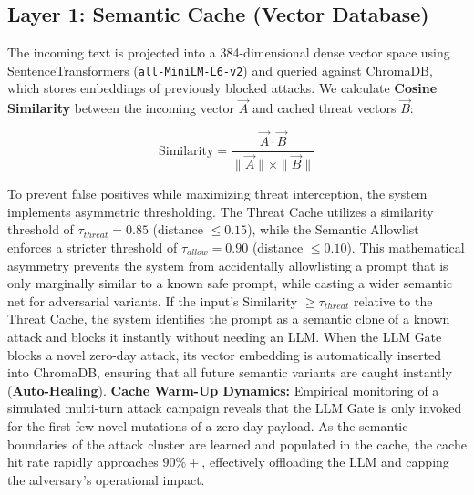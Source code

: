 \documentclass[conference]{IEEEtran}
\begin{document}
\subsection{Layer 1: Semantic Cache (Vector Database)}
The incoming text is projected into a 384-dimensional dense vector space using SentenceTransformers (\texttt{all-MiniLM-L6-v2}) and queried against ChromaDB, which stores embeddings of previously blocked attacks. We calculate \textbf{Cosine Similarity} between the incoming vector $\vec{A}$ and cached threat vectors $\vec{B}$:

\begin{equation}
\text{Similarity} = \frac{\vec{A} \cdot \vec{B}}{\|\vec{A}\| \times \|\vec{B}\|}
\end{equation}

To prevent false positives while maximizing threat interception, the system implements asymmetric thresholding. The Threat Cache utilizes a similarity threshold of $\tau_{threat} = 0.85$ (distance $\leq 0.15$), while the Semantic Allowlist enforces a stricter threshold of $\tau_{allow} = 0.90$ (distance $\leq 0.10$). This mathematical asymmetry prevents the system from accidentally allowlisting a prompt that is only marginally similar to a known safe prompt, while casting a wider semantic net for adversarial variants. If the input's Similarity $\geq \tau_{threat}$ relative to the Threat Cache, the system identifies the prompt as a semantic clone of a known attack and blocks it instantly without needing an LLM. When the LLM Gate blocks a novel zero-day attack, its vector embedding is automatically inserted into ChromaDB, ensuring that all future semantic variants are caught instantly (\textbf{Auto-Healing}). \textbf{Cache Warm-Up Dynamics:} Empirical monitoring of a simulated multi-turn attack campaign reveals that the LLM Gate is only invoked for the first few novel mutations of a zero-day payload. As the semantic boundaries of the attack cluster are learned and populated in the cache, the cache hit rate rapidly approaches $90\%+$, effectively offloading the LLM and capping the adversary's operational impact.
\end{document}
